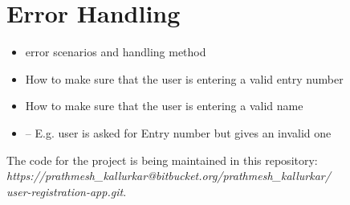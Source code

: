 \documentclass[12pt,a4paper,titlepage]{article}
\begin{document}
\section{Error Handling}
\begin{itemize}
	        
	\item error scenarios and handling method
	      
	      
	\item How to make sure that the user is entering a valid entry number
	\item How to make sure that the user is entering a valid name
	          
	\item – E.g.	user	is	asked	for	Entry	number	but	gives	an	invalid	one	
\end{itemize}

The code for the project is being maintained in this repository:\\ {\em https://prathmesh\_kallurkar@bitbucket.org/prathmesh\_kallurkar/ \\ user-registration-app.git}.



\end{document}
